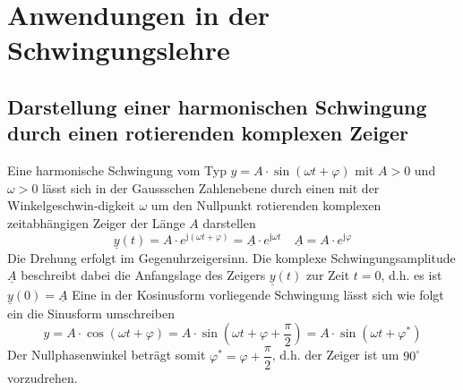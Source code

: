 \section{Anwendungen in der Schwingungslehre}
\subsection{Darstellung einer harmonischen Schwingung durch einen rotierenden komplexen Zeiger}
Eine harmonische Schwingung vom Typ $y=A\cdot\sin\left(\omega t+\varphi\right)$ mit $A>0$ und $\omega>0$ lässt sich in der Gaussschen Zahlenebene durch einen mit der Winkelgeschwin-digkeit $\omega$ um den Nullpunkt rotierenden komplexen zeitabhängigen Zeiger der Länge $A$ darstellen
\begin{equation}
\boxed{\underline{y}\left(t\right)=A\cdot e^{\text{j}\left(\omega t+\varphi\right)}=\underline{A}\cdot e^{\text{j}\omega t}}\quad \boxed{\underline{A}=A\cdot e^{\text{j}\varphi}}
\end{equation}
Die Drehung erfolgt im Gegenuhrzeigersinn. Die komplexe Schwingungsamplitude $\underline{A}$ beschreibt dabei die Anfangslage des Zeigers $\underline{y}\left(t\right)$ zur Zeit $t=0$, d.h. es ist $\underline{y}\left(0\right)=\underline{A}$
\newline\newline
Eine in der Kosinusform vorliegende Schwingung lässt sich wie folgt ein die Sinusform umschreiben
\begin{equation}
\boxed{y=A\cdot \cos\left(\omega t+\varphi\right)=A\cdot \sin\left(\omega t+\varphi+\dfrac{\pi}{2}\right)=A\cdot \sin\left(\omega t+\varphi^*\right)}
\end{equation}
Der Nullphasenwinkel beträgt somit $\varphi^*=\varphi+\dfrac{\pi}{2}$, d.h. der Zeiger ist um $90^{\circ}$ vorzudrehen.
